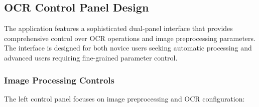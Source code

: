\subsection{OCR Control Panel Design}

The application features a sophisticated dual-panel interface that provides comprehensive control over OCR operations and image preprocessing parameters. The interface is designed for both novice users seeking automatic processing and advanced users requiring fine-grained parameter control.

\subsubsection{Image Processing Controls}

The left control panel focuses on image preprocessing and OCR configuration:

